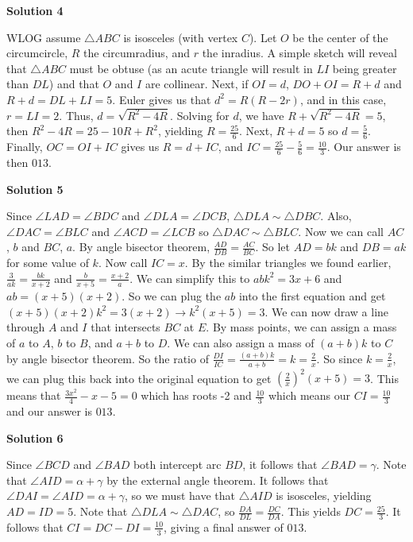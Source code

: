 \begin{enumerate}
\textbf{Solution 4}

WLOG assume $\triangle ABC$ is isosceles (with vertex $C$). Let $O$ be the center of the circumcircle, $R$ the circumradius, and $r$ the inradius. A simple sketch will reveal that $\triangle ABC$ must be obtuse (as an acute triangle will result in $LI$ being greater than $DL$) and that $O$ and $I$ are collinear. Next, if $OI=d$, $DO+OI=R+d$ and $R+d=DL+LI=5$. Euler gives us that $d^{2}=R(R-2r)$, and in this case, $r=LI=2$. Thus, $d=\sqrt{R^{2}-4R}$. Solving for $d$, we have $R+\sqrt{R^{2}-4R}=5$, then $R^{2}-4R=25-10R+R^{2}$, yielding $R=\frac{25}{6}$. Next, $R+d=5$ so $d=\frac{5}{6}$. Finally, $OC=OI+IC$ gives us $R=d+IC$, and $IC=\frac{25}{6}-\frac{5}{6}=\frac{10}{3}$. Our answer is then $\boxed{013}$.

 



\textbf{Solution 5}

Since $\angle{LAD} = \angle{BDC}$ and $\angle{DLA}=\angle{DCB}$, $\triangle{DLA}\sim\triangle{DBC}$. Also, $\angle{DAC}=\angle{BLC}$ and $\angle{ACD}=\angle{LCB}$ so $\triangle{DAC}\sim\triangle{BLC}$. Now we can call $AC$, $b$ and $BC$, $a$. By angle bisector theorem, $\frac{AD}{DB}=\frac{AC}{BC}$. So let $AD=bk$ and $DB=ak$ for some value of $k$. Now call $IC=x$. By the similar triangles we found earlier, $\frac{3}{ak}=\frac{bk}{x+2}$ and $\frac{b}{x+5}=\frac{x+2}{a}$. We can simplify this to $abk^2=3x+6$ and $ab=(x+5)(x+2)$. So we can plug the $ab$ into the first equation and get $(x+5)(x+2)k^2=3(x+2) \rightarrow k^2(x+5)=3$. We can now draw a line through $A$ and $I$ that intersects $BC$ at $E$. By mass points, we can assign a mass of $a$ to $A$, $b$ to $B$, and $a+b$ to $D$. We can also assign a mass of $(a+b)k$ to $C$ by angle bisector theorem. So the ratio of $\frac{DI}{IC}=\frac{(a+b)k}{a+b}=k=\frac{2}{x}$. So since $k=\frac{2}{x}$, we can plug this back into the original equation to get $\left(\frac{2}{x}\right)^2(x+5)=3$. This means that $\frac{3x^2}{4}-x-5=0$ which has roots -2 and $\frac{10}{3}$ which means our $CI=\frac{10}{3}$ and our answer is $\boxed{013}$.

 



\textbf{Solution 6}

Since $\angle BCD$ and $\angle BAD$ both intercept arc $BD$, it follows that $\angle BAD=\gamma$. Note that $\angle AID=\alpha+\gamma$ by the external angle theorem. It follows that $\angle DAI=\angle AID=\alpha+\gamma$, so we must have that $\triangle AID$ is isosceles, yielding $AD=ID=5$. Note that $\triangle DLA \sim \triangle DAC$, so $\frac{DA}{DL} = \frac{DC}{DA}$. This yields $DC = \frac{25}{3}$. It follows that $CI = DC - DI = \frac{10}{3}$, giving a final answer of $\boxed{013}$.


\end{enumerate}
